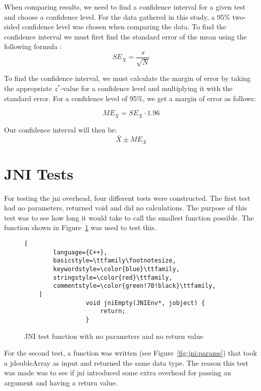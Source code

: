 When comparing results, we need to find a confidence interval for a given test and choose a confidence level. For the data gathered in this study, a 95\% two-sided confidence level was chosen when comparing the data. To find the confidence interval we must first find the standard error of the mean using the following formula \cite[p.~304]{olofsson2012probability}:
\begin{equation*}
    SE_{\bar{X}} = \frac{s}{\sqrt{N}}
\end{equation*}

To find the confidence interval, we must calculate the margin of error by taking the appropriate $z^*$-value for a confidence level and multiplying it with the standard error. For a confidence level of 95\%, we get a margin of error as follows:

\begin{equation*}
    ME_{\bar{X}} = SE_{\bar{X}} \cdot 1.96
\end{equation*}

Our confidence interval will then be:
\begin{equation*}
    \bar{X} \pm ME_{\bar{X}}
\end{equation*}

\section{JNI Tests}
For testing the \gls{jni} overhead, four different tests were constructed. The first test had no parameters, returned void and did no calculations. The purpose of this test was to see how long it would take to call the smallest function possible. The function shown in Figure~\ref{fig:jni:empty} was used to test this.

\begin{figure}[H]
\begin{lstlisting}[
        language={C++},
        basicstyle=\ttfamily\footnotesize,
        keywordstyle=\color{blue}\ttfamily,
        stringstyle=\color{red}\ttfamily,
        commentstyle=\color{green!70!black}\ttfamily,
    ]
                 void jniEmpty(JNIEnv*, jobject) {
                     return;
                 }
\end{lstlisting}
\caption{JNI test function with no parameters and no return value}
\label{fig:jni:empty}
\end{figure}

For the second test, a function was written (see Figure~\ref{fig:jni:params}) that took a jdoubleArray as input and returned the same data type. The reason this test was made was to see if \gls{jni} introduced some extra overhead for passing an argument and having a return value.

